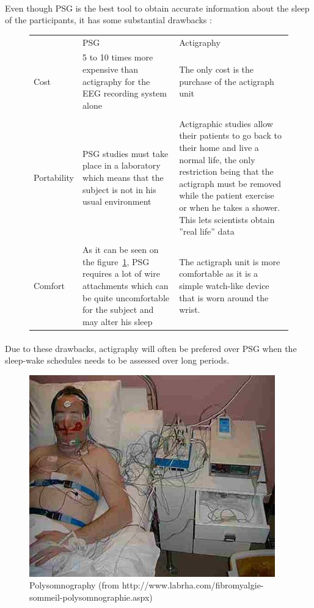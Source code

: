 \documentclass[a4paper,12pt]{article}
\newlength\savewidth
\newcommand\Ghline{%
	\noalign{\global\savewidth\arrayrulewidth\global\arrayrulewidth2pt}%
	\hline
	\noalign{\global\arrayrulewidth\savewidth}}
\begin{document}
\paragraph{}
Even though PSG is the best tool to obtain accurate information about the sleep of the participants, it has some substantial drawbacks :

\begin{figure}[H]
\centering
\begin{tabularx}{\textwidth}{|X|X|X|}
\hline
& PSG & Actigraphy \\
\Ghline
Cost & 5 to 10 times more expensive than actigraphy for the EEG recording system alone~\cite{Mullaney1980} & The only cost is the purchase of the actigraph unit \\
& & \\
Portability & PSG studies must take place in a laboratory which means that the subject is not in his usual environment & Actigraphic studies allow their patients to go back to their home and live a normal life, the only restriction being that the actigraph must be removed while the patient exercise or when he takes a shower. This lets scientists obtain ''real life'' data \\
& & \\
Comfort & As it can be seen on the figure~\ref{PSG}, PSG requires a lot of wire attachments which can be quite uncomfortable for the subject and may alter his sleep & The actigraph unit is more comfortable as it is a simple watch-like device that is worn around the wrist. \\
\hline
\end{tabularx}
\end{figure}

\paragraph{}
Due to these drawbacks, actigraphy will often be prefered over PSG when the sleep-wake schedules needs to be assessed over long periods.

\begin{figure}[H]
\centering
\includegraphics[scale=1]{Images/PSG.jpg}
\caption{Polysomnography (from http://www.labrha.com/fibromyalgie-sommeil-polysomnographie.aspx)}
\label{PSG}
\end{figure}
\end{document}
